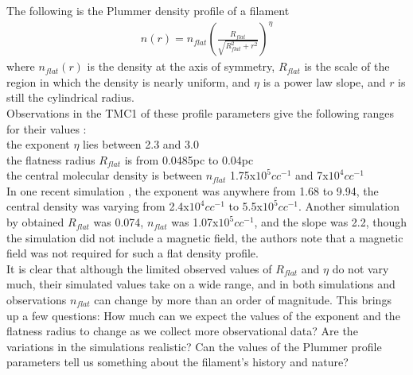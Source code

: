 \documentclass[a4paper,12pt]{article}
\begin{document}
The following is the Plummer density profile of a filament \citep{plu1911}
\begin{align}
n(r) = n_{flat}\left(\frac{R_{flat}}{\sqrt{R_{flat}^2 + r^2}}\right)^\eta
\end{align} where $n_{flat}(r)$ is the density at the axis of symmetry, $R_{flat}$ is the scale of the region in which the density is nearly uniform, and $\eta$ is a power law slope, and $r$ is still the cylindrical radius.\\

Observations in the TMC1 of these profile parameters give the following ranges for their values \citep{nut08} \citep{mal12}: \\
the exponent $\eta$ lies between 2.3 and 3.0\\
the flatness radius $R_{flat}$ is from 0.0485pc to 0.04pc\\
the central molecular density is between $n_{flat}$ 1.75x$10^5cc^{-1}$ and 7x$10^{4}cc^{-1}$\\

In one recent simulation \citep{jml12}, the exponent was anywhere from 1.68 to 9.94, the central density was varying from 2.4x$10^{4}cc^{-1}$ to 5.5x$10^5cc^{-1}$. Another simulation by \cite{sgk14} obtained $R_{flat}$ was 0.074, $n_{flat}$ was 1.07x$10^5cc^{-1}$, and the slope was 2.2, though the simulation did not include a magnetic field, the authors note that a magnetic field was not required for such a flat density profile.\\

It is clear that although the limited observed values of $R_{flat}$ and $\eta$ do not vary much, their simulated values take on a wide range, and in both simulations and observations $n_{flat}$ can change by more than an order of magnitude. This brings up a few questions: How much can we expect the values of the exponent and the flatness radius to change as we collect more observational data? Are the variations in the simulations realistic? Can the values of the Plummer profile parameters tell us something about the filament's history and nature?\\
\end{document}

